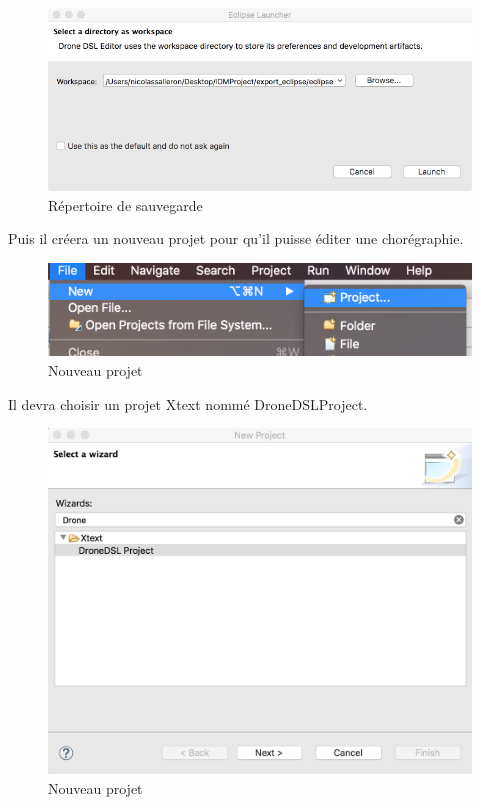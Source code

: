 \documentclass[12pt]{article}
\begin{document}
        \begin{figure}[!h]
        \centering
        \includegraphics[scale=0.50]{03.png}
        \caption{Répertoire de sauvegarde}
        \end{figure}
        
        Puis il créera un nouveau projet pour qu'il puisse éditer une chorégraphie.
                
        \begin{figure}[!h]
        \centering
        \includegraphics[scale=0.20]{04.png}
        \caption{Nouveau projet}
        \end{figure}
    
        Il devra choisir un projet Xtext nommé DroneDSLProject.
        
        \begin{figure}[!h]
        \centering
        \includegraphics[scale=0.40]{05.png}
        \caption{Nouveau projet}
        \end{figure}
        
\end{document}
